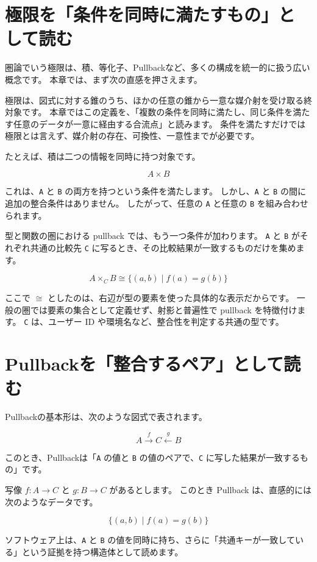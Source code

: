 \section{極限を「条件を同時に満たすもの」として読む}

圏論でいう極限は、積、等化子、Pullbackなど、多くの構成を統一的に扱う広い概念です。
本章では、まず次の直感を押さえます。

極限は、図式に対する錐のうち、ほかの任意の錐から一意な媒介射を受け取る終対象です。
本章ではこの定義を、「複数の条件を同時に満たし、同じ条件を満たす任意のデータが一意に経由する合流点」と読みます。
条件を満たすだけでは極限とは言えず、媒介射の存在、可換性、一意性までが必要です。

たとえば、積は二つの情報を同時に持つ対象です。

\[
A \times B
\]

これは、\texttt{A} と \texttt{B} の両方を持つという条件を満たします。
しかし、\texttt{A} と \texttt{B} の間に追加の整合条件はありません。
したがって、任意の \texttt{A} と任意の \texttt{B} を組み合わせられます。

型と関数の圏における pullback では、もう一つ条件が加わります。
\texttt{A} と \texttt{B} がそれぞれ共通の比較先 \texttt{C} に写るとき、その比較結果が一致するものだけを集めます。

\[
A \times_C B \cong \{(a,b) \mid f(a) = g(b)\}
\]

ここで \(\cong\) としたのは、右辺が型の要素を使った具体的な表示だからです。
一般の圏では要素の集合として定義せず、射影と普遍性で pullback を特徴付けます。
\texttt{C} は、ユーザー ID や環境名など、整合性を判定する共通の型です。

\section{Pullbackを「整合するペア」として読む}

Pullbackの基本形は、次のような図式で表されます。

\[
A \xrightarrow{f} C \xleftarrow{g} B
\]

このとき、Pullbackは「\texttt{A} の値と \texttt{B} の値のペアで、\texttt{C} に写した結果が一致するもの」です。

写像 \(f : A \to C\) と \(g : B \to C\) があるとします。
このとき Pullback は、直感的には次のようなデータです。

\[
\{(a,b) \mid f(a) = g(b)\}
\]

ソフトウェア上は、\texttt{A} と \texttt{B} の値を同時に持ち、さらに「共通キーが一致している」という証拠を持つ構造体として読めます。

